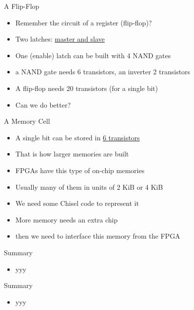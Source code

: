 \begin{frame}[fragile]{A Flip-Flop}
\begin{itemize}
\item Remember the circuit of a register (flip-flop)?
\item Two latches: \href{https://en.wikipedia.org/wiki/Flip-flop_(electronics)#Master%E2%80%93slave_edge-triggered_D_flip-flop}{master and slave}
\item One (enable) latch can be built with 4 NAND gates
\item a NAND gate needs 6 transistors, an inverter 2 transistors
\item A flip-flop needs 20 transistors (for a single bit)
\item Can we do better?
\end{itemize}
\end{frame}

\begin{frame}[fragile]{A Memory Cell}
\begin{itemize}
\item A single bit can be stored in \href{https://en.wikipedia.org/wiki/Static_random-access_memory#/media/File:SRAM_Cell_(6_Transistors).svg}{6 transistors}
\item That is how larger memories are built
\item FPGAs have this type of on-chip memories
\item Usually many of them in units of 2 KiB or 4 KiB
\item We need some Chisel code to represent it
\item More memory needs an extra chip
\item then we need to interface this memory from the FPGA
\end{itemize}

\end{frame}

\begin{frame}[fragile]{Summary}
\begin{itemize}
\item yyy
\end{itemize}
\end{frame}

\begin{frame}[fragile]{Summary}
\begin{itemize}
\item yyy
\end{itemize}
\end{frame}

